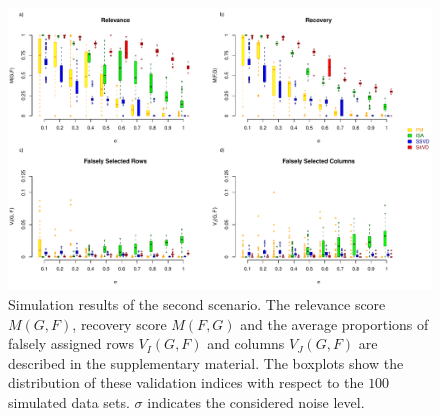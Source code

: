 \begin{center}
\begin{figure}[t]
\includegraphics[width=145 mm]{./Bilder/scenario3.pdf}
\caption{ Simulation results of the second scenario. The relevance score $M(G,F)$, recovery score $M(F,G)$ and the average proportions of falsely assigned rows $V_{I}(G,F)$ and columns $V_{J}(G,F)$ are described in the supplementary material. The boxplots show the distribution of these validation indices with respect to the $100$ simulated data sets. $\sigma$ indicates the considered noise level. \label{fig:03} 
}
\end{figure}
\end{center}

